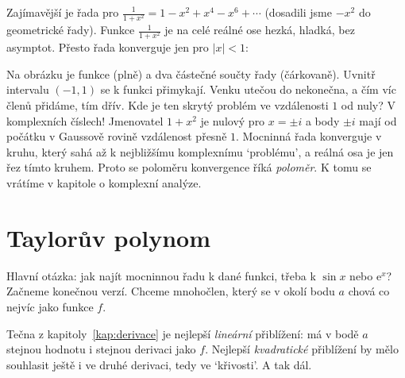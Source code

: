 Zajímavější je řada pro $\frac{1}{1 + x^2} = 1 - x^2 + x^4 - x^6 + \cdots$ (dosadili jsme $-x^2$ do geometrické řady). Funkce $\frac{1}{1 + x^2}$ je na celé reálné ose hezká, hladká, bez asymptot. Přesto řada konverguje jen pro $|x| < 1$:

\begin{center}
\end{center}

Na obrázku je funkce (plně) a dva částečné součty řady (čárkovaně). Uvnitř intervalu $(-1, 1)$ se k funkci přimykají. Venku utečou do nekonečna, a čím víc členů přidáme, tím dřív. Kde je ten skrytý problém ve vzdálenosti $1$ od nuly? V komplexních číslech! Jmenovatel $1 + x^2$ je nulový pro $x = \pm i$ a body $\pm i$ mají od počátku v Gaussově rovině vzdálenost přesně $1$. Mocninná řada konverguje v kruhu, který sahá až k nejbližšímu komplexnímu `problému', a reálná osa je jen řez tímto kruhem. Proto se poloměru konvergence říká \textit{poloměr}. K tomu se vrátíme v kapitole o komplexní analýze.

\section{Taylorův polynom}

Hlavní otázka: jak najít mocninnou řadu k dané funkci, třeba k $\sin x$ nebo $\mathrm{e}^x$? Začneme konečnou verzí. Chceme mnohočlen, který se v okolí bodu $a$ chová co nejvíc jako funkce $f$.

Tečna z kapitoly~\ref{kap:derivace} je nejlepší \textit{lineární} přiblížení: má v bodě $a$ stejnou hodnotu i stejnou derivaci jako $f$. Nejlepší \textit{kvadratické} přiblížení by mělo souhlasit ještě i ve druhé derivaci, tedy ve `křivosti'. A tak dál.

